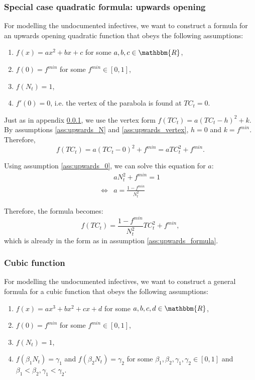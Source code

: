 \documentclass[12pt]{article}
\newcommand{\R}{\mathbbm{R}}
\begin{document}
\begin{appendices}
		\subsubsection{Special case quadratic formula: upwards opening} \label{ssapp:upwards_derivation_vertex}
		For modelling the undocumented infectives, we want to construct a formula for an upwards opening quadratic function that obeys the following assumptions:
		\begin{enumerate}[label=(\Roman*)]
		    \item\label{ass:upwards_formula} $f(x) = ax^2 + bx + c$  for some $a, b, c \in \R$,
		    \item\label{ass:upwards_0} $f(0) = f^{min}$ for some $f^{min} \in [0,1]$,
		    \item\label{ass:upwards_N} $f(N_t) = 1$,
		    \item\label{ass:upwards_vertex} $f'(0) = 0$, i.e. the vertex of the parabola is found at $TC_t = 0$.
		\end{enumerate}
		
		Just as in appendix \ref{ssapp:upwards_derivation_vertex}, we use the vertex form $f(TC_t) = a(TC_t - h)^2 + k$. By assumptions \ref{ass:upwards_N} and \ref{ass:upwards_vertex}, $h=0$ and $k=f^{min}$. Therefore,
		    \[f(TC_t) = a(TC_t - 0)^2 + f^{min} = aTC_t^2 + f^{min}.\]
		    
		Using assumption \ref{ass:upwards_0}, we can solve this equation for $a$:
		    \begin{align*}
		             & aN_t^2 + f^{min} = 1\\
		        \iff & a = \frac{1 - f^{min}}{N_t^2}
		    \end{align*}
		    
		Therefore, the formula becomes:
		    \[f(TC_t) = \frac{1 - f^{min}}{N_t^2}TC_t^2 + f^{min},\]
		which is already in the form as in assumption \ref{ass:upwards_formula}.
		
		\subsubsection{Cubic function} \label{ssapp:cubic_derivation}
		For modelling the undocumented infectives, we want to construct a general formula for a cubic function that obeys the following assumptions:
		\begin{enumerate}[label=(\Roman*)]
		    \item\label{ass:cubic_formula} $f(x) = ax^3 + bx^2 + cx + d$  for some $a, b, c, d \in \R$,
		    \item\label{ass:cubic_0} $f(0) = f^{min}$ for some $f^{min} \in [0,1]$,
		    \item\label{ass:cubic_N} $f(N_t) = 1$,
		    \item\label{ass:cubic_betaN} $f(\beta_1 N_t) = \gamma_1$ and $f(\beta_2 N_t) = \gamma_2$ for some $\beta_1, \beta_2, \gamma_1, \gamma_2 \in [0,1]$ and $\beta_1 < \beta_2, \gamma_1 < \gamma_2$.
		\end{enumerate}
		

\end{appendices}
\end{document}

